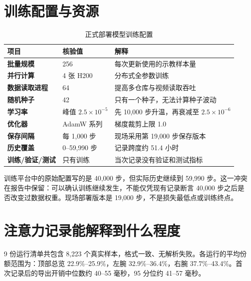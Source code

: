 \section{训练配置与资源}

\begin{table}[H]
\centering
\caption{正式部署模型训练配置}
\begin{tabularx}{\textwidth}{>{\bfseries}p{37mm}p{38mm}X}
\toprule
项目 & 核验值 & 解释\\
\midrule
批量规模 & 256 & 每次更新使用的示教样本量\\
并行计算 & 4 张 H200 & 分布式全参数训练\\
数据读取进程 & 64 & 提高多仓库与视频读取吞吐\\
随机种子 & 42 & 只有一个种子，无法计算种子波动\\
学习率 & 峰值 $2.5\times10^{-5}$ & 先 10,000 步升温，再衰减至 $2.5\times10^{-6}$\\
优化器 & AdamW 系列 & 梯度裁剪上限 1.0\\
保存间隔 & 每 1,000 步 & 现场采用第 19,000 步保存版本\\
历史覆盖 & 0--59,990 步 & 记录跨度约 51.4 小时\\
训练/验证/测试 & 只有训练 & 当次记录没有验证和测试指标\\
\bottomrule
\end{tabularx}
\end{table}

训练平台中的原始配置写的是 40,000 步，但实际历史继续到 59,990 步。这一冲突在报告中保留：可以确认训练继续发生，不能仅凭现有记录断言 40,000 步之后是否改变过数据权重。现场部署版本是 19,000 步，不是损失最低点或训练终点。

\section{注意力记录能解释到什么程度}



9 份运行清单共包含 8,223 个真实样本，格式一致、无解析失败。各运行的平均份额范围为：顶部总览 22.9\%--25.9\%，左腕 32.9\%--36.4\%，右腕 37.7\%--43.4\%。首次记录后的导出开销中位数约 40--55 毫秒，95 分位约 41--57 毫秒。

